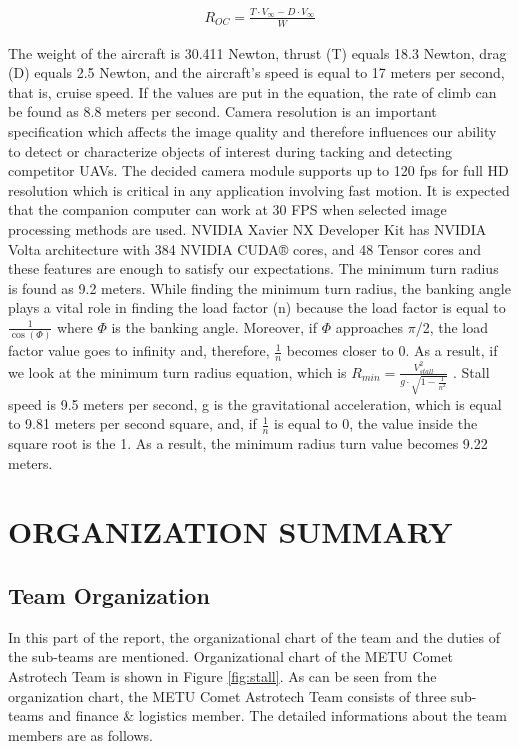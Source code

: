 \documentclass[12pt]{article}
\begin{document}
\begin{align}
	R_{OC} = \frac{T \cdot V_\infty - D \cdot V_\infty}{W}
\end{align}

\justify
The weight of the aircraft is 30.411 Newton, thrust (T) equals 18.3 Newton, drag (D) equals 2.5 Newton, and the aircraft's speed is equal to 17 meters per second, that is, cruise speed. If the values are put in the equation, the rate of climb can be found as 8.8 meters per second.
\justify
Camera resolution is an important specification which affects the image quality and therefore influences our ability to detect or characterize objects of interest during tacking and detecting competitor UAVs. The decided camera module supports up to 120 fps for full HD resolution which is critical in any application involving fast motion.
\justify
It is expected that the companion computer can work at 30 FPS when selected image processing methods are used. NVIDIA Xavier NX Developer Kit has NVIDIA Volta architecture with 384 NVIDIA CUDA® cores, and 48 Tensor cores and these features are enough to satisfy our expectations. 
\justify
The minimum turn radius is found as 9.2 meters. While finding the minimum turn radius, the banking angle plays a vital role in finding the load factor (n) because the load factor is equal to $\frac{1}{\cos(\Phi)}$ where $\Phi$ is the banking angle. Moreover, if $\Phi$  approaches $\pi$/2, the load factor value goes to infinity and, therefore, $\frac{1}{n}$ becomes closer to 0. As a result, if we look at the minimum turn radius equation, which is $R_{min}=\frac{V^2_{stall}}{g \cdot \sqrt{1-\frac{1}{n^2}}}$ . Stall speed is 9.5 meters per second, g is the gravitational acceleration, which is equal to 9.81 meters per second square, and, if $\frac{1}{n}$ is equal to 0, the value inside the square root is the 1. As a result, the minimum radius turn value becomes 9.22 meters.


\section{ORGANIZATION SUMMARY}
\subsection{Team Organization}
\justify In this part of the report, the organizational chart of the team and the duties of the sub-teams are mentioned. Organizational chart of the METU Comet Astrotech Team is shown in Figure \ref{fig:stall}. As can be seen from the organization chart, the METU Comet Astrotech Team consists of three  sub-teams and finance \& logistics member. The detailed informations about the team members are as follows.
\end{document}

